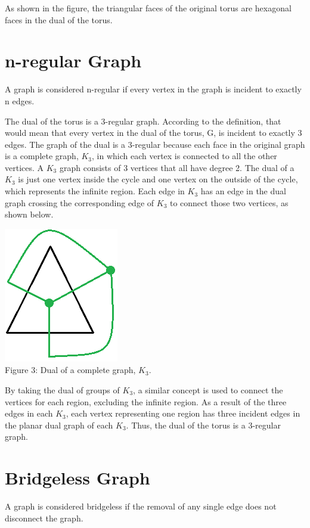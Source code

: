 \documentclass[12pt]{article}
\begin{document}
\begin{flushleft}
As shown in the figure, the triangular faces of the original torus are hexagonal faces in the dual of the torus.

\section*{n-regular Graph}
A graph is considered n-regular if every vertex in the graph is incident to exactly n edges.

\medskip
The dual of the torus is a 3-regular graph. According to the definition, that would mean that every vertex in the dual of the torus, G, is incident to exactly 3 edges. The graph of the dual is a 3-regular because each face in the original graph is a complete graph, $K_3$, in which each vertex is connected to all the other vertices. A $K_3$ graph consists of 3 vertices that all have degree 2. The dual of a $K_3$ is just one vertex inside the cycle and one vertex on the outside of the cycle, which represents the infinite region. Each edge in $K_3$ has an edge in the dual graph crossing the corresponding edge of $K_3$ to connect those two vertices, as shown below.

\begin{center}
\includegraphics[scale=1]{images/k3dual.png}\\
Figure 3: Dual of a complete graph, $K_3$.
\end{center}

\medskip
By taking the dual of groups of $K_3$, a similar concept is used to connect the vertices for each region, excluding the infinite region. As a result of the three edges in each $K_3$, each vertex representing one region has three incident edges in the planar dual graph of each $K_3$. Thus, the dual of the torus is a 3-regular graph.

\section*{Bridgeless Graph}
A graph is considered bridgeless if the removal of any single edge does not disconnect the graph.


\end{flushleft}
\end{document}
